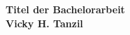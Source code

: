 \documentclass[a4paper]{article}
\begin{document}
\begin{center}
   \large\bfseries
   Titel der Bachelorarbeit\\
   Vicky H. Tanzil\\
   \vspace{0.5cm}
\end{center}
\end{document}
